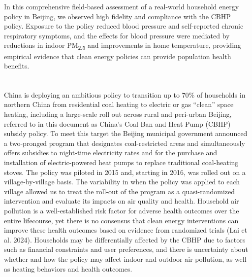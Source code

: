 \documentclass[
  letterpaper,
  DIV=11,
  numbers=noendperiod]{scrartcl}
\providecommand{\DIFaddtex}[1]{{\protect\color{blue}\uwave{#1}}} %
\providecommand{\DIFaddbegin}{} %
\providecommand{\DIFaddend}{} %
\providecommand{\DIFdelbegin}{} %
\providecommand{\DIFdelend}{} %
\providecommand{\DIFadd}[1]{\texorpdfstring{\DIFaddtex{#1}}{#1}} %
\newcommand{\DIFscaledelfig}{0.5}
\newlength{\DIFdelgraphicswidth} %
\newlength{\DIFdelgraphicsheight} %
\newcommand{\DIFaddincludegraphics}[2][]{{\color{blue}\fbox{\DIFOincludegraphics[#1]{#2}}}} %
\newcommand{\DIFdelincludegraphics}[2][]{%
\sbox{\DIFdelgraphicsbox}{\DIFOincludegraphics[#1]{#2}}%
\settoboxwidth{\DIFdelgraphicswidth}{\DIFdelgraphicsbox} %
\settoboxtotalheight{\DIFdelgraphicsheight}{\DIFdelgraphicsbox} %
\scalebox{\DIFscaledelfig}{%
\parbox[b]{\DIFdelgraphicswidth}{\usebox{\DIFdelgraphicsbox}\\[-\baselineskip] \rule{\DIFdelgraphicswidth}{0em}}\llap{\resizebox{\DIFdelgraphicswidth}{\DIFdelgraphicsheight}{%
\setlength{\unitlength}{\DIFdelgraphicswidth}%
\begin{picture}(1,1)%
\thicklines\linethickness{2pt} %
{\color[rgb]{1,0,0}\put(0,0){\framebox(1,1){}}}%
{\color[rgb]{1,0,0}\put(0,0){\line( 1,1){1}}}%
{\color[rgb]{1,0,0}\put(0,1){\line(1,-1){1}}}%
\end{picture}%
}\hspace*{3pt}}} %
} %
\DeclareRobustCommand{\DIFaddbegin}{\DIFOaddbegin \let\includegraphics\DIFaddincludegraphics} %
\DeclareRobustCommand{\DIFaddend}{\DIFOaddend \let\includegraphics\DIFOincludegraphics} %
\DeclareRobustCommand{\DIFdelbegin}{\DIFOdelbegin \let\includegraphics\DIFdelincludegraphics} %
\DeclareRobustCommand{\DIFdelend}{\DIFOaddend \let\includegraphics\DIFOincludegraphics} %
\begin{document}
In this comprehensive field-based assessment of a real-world household
energy policy in Beijing, we observed high fidelity and compliance with
the CBHP policy. Exposure to the policy reduced blood pressure and
self-reported chronic respiratory symptoms, and the effects for blood
pressure were mediated by reductions in indoor PM\textsubscript{2.5} and
improvements in home temperature, providing empirical evidence that
clean energy policies can provide population health benefits.

\newpage

\DIFdelbegin %
\DIFdelend \DIFaddbegin \section{\DIFadd{Introduction}}\label{introduction-1}
\DIFaddend 

China is deploying an ambitious policy to transition up to 70\% of
households in northern China from residential coal heating to electric
or gas ``clean'' space heating, including a large-scale roll out across
rural and peri-urban Beijing, referred to in this document as China's
Coal Ban and Heat Pump (CBHP) subsidy policy. To meet this target the
Beijing municipal government announced a two-pronged program that
designates coal-restricted areas and simultaneously offers subsidies to
night-time electricity rates and for the purchase and installation of
electric-powered heat pumps to replace traditional coal-heating stoves.
The policy was piloted in 2015 and, starting in 2016, was rolled out on
a village-by-village basis. The variability in when the policy was
applied to each village allowed us to treat the roll-out of the program
as a quasi-randomized intervention and evaluate its impacts on air
quality and health. Household air pollution is a well-established risk
factor for adverse health outcomes over the entire lifecourse, yet there
is no consensus that clean energy interventions can improve these health
outcomes based on evidence from randomized trials (Lai et al. 2024).
Households may be differentially affected by the CBHP due to factors
such as financial constraints and user preferences, and there is
uncertainty about whether and how the policy may affect indoor and
outdoor air pollution, as well as heating behaviors and health outcomes.
\end{document}
